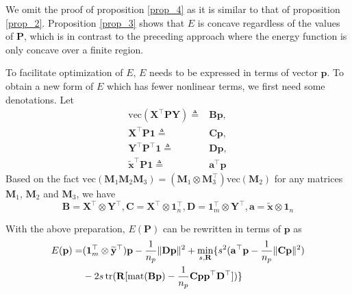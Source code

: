 \documentclass[11pt,bezier,]{article}
\begin{document}
We omit the proof of proposition \ref{prop_4} 
as it is similar to that of proposition \ref{prop_2}.
Proposition \ref{prop_3} shows that $E$ is concave regardless of the values of $\mathbf P$,
which is in contrast to the preceding approach
where  the energy function is only concave over a finite  region.





To facilitate  optimization of $E$,
$E$ needs to be expressed in terms of vector $\mathbf p$.
To obtain a new form of $E$ which has fewer nonlinear terms, 
we first need some  denotations. 
Let
\begin{align}
 \text{vec}(\mathbf X^\top\mathbf P\mathbf Y)\triangleq &\mathbf  B\mathbf  p, \label{B_denote}\\
 \mathbf X^\top\mathbf P\mathbf 1\triangleq & \mathbf C\mathbf  p, \\
 \mathbf Y^\top\mathbf P^\top\mathbf  1\triangleq & \mathbf D\mathbf p,\\
 \mathbf {\widetilde x}^\top\mathbf P \mathbf 1\triangleq & \mathbf  a^\top\mathbf  p
\end{align}
Based on the fact 
$\text{vec}(\mathbf M_1 \mathbf M_2 \mathbf M_3)
= (\mathbf M_1\otimes \mathbf M_3^\top)\text{vec}(\mathbf M_2)$
for any matrices $\mathbf M_1$, $\mathbf M_2$ and $\mathbf M_3$, we have
\[
\mathbf  B=\mathbf X^\top\otimes \mathbf Y^\top,
\mathbf C=\mathbf X^\top\otimes\mathbf  1_n^\top, 
\mathbf D=\mathbf 1_m^\top\otimes \mathbf Y^\top, 
\mathbf  a=\mathbf {\widetilde x} \otimes\mathbf  1_n
\]



With the above preparation, 
$E(\mathbf P)$  can be rewritten in terms of  $\mathbf p$ as
\begin{align}
E(\mathbf p)= &  
(\mathbf 1_m^\top\otimes\mathbf { \widetilde y}^\top)\mathbf  p 
- \frac{1}{n_p} \|\mathbf D\mathbf  p \|^2  %
+ \min_{s,\mathbf R} \{s^2 (\mathbf a^\top\mathbf  p   - \frac{1}{n_p}    \| \mathbf C\mathbf  p \|^2)  \notag\\
 &- 2s\, \text{tr}(\mathbf R [ \text{mat} (\mathbf B\mathbf p)  - \frac{1}{n_p} \mathbf C\mathbf p\mathbf  p^\top \mathbf D^\top ]) \} \label{Eompact}
\end{align}
\end{document}
